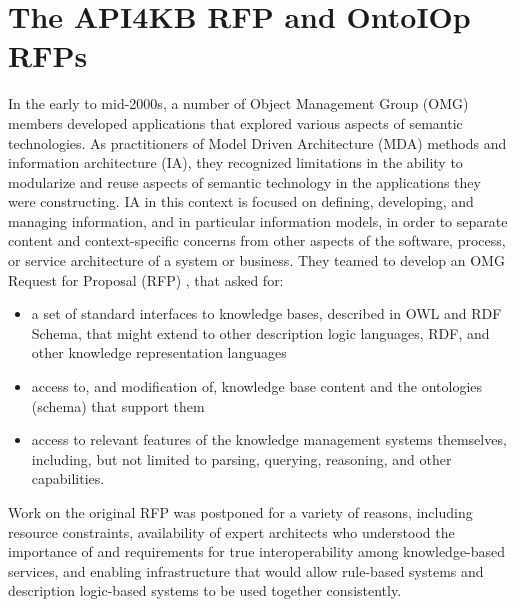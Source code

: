 \documentclass[runningheads]{llncs}
\begin{document}


\section{The API4KB RFP and OntoIOp RFPs}
\label{sec:bg}

In the early to mid-2000s, a number of Object Management Group (OMG) members developed applications that explored various aspects of semantic technologies.  As practitioners of Model Driven Architecture (MDA) methods \cite{MDA} and information architecture (IA), they recognized limitations in the ability to modularize and reuse aspects of semantic technology in the applications they were constructing.  IA in this context is focused on defining, developing, and managing information,
and in particular information models, in order to separate content and context-specific
concerns from other aspects of the software, process, or service architecture of a system or business.  They teamed to develop an OMG Request for Proposal (RFP) \cite{API4KB}, that asked for: 
\begin{itemize}
\item  a set of standard interfaces to knowledge bases, described in OWL and RDF Schema, that might extend to other description logic languages, RDF, and other
knowledge representation languages 
\item access to, and modification of, knowledge base content and the ontologies (schema) that support them
\item access to relevant features of the knowledge management systems themselves, including, but not limited to parsing, querying, reasoning, and other capabilities.
\end{itemize}

Work on the original RFP was postponed for a variety of reasons, including resource constraints, availability of expert architects who understood the importance of and requirements for true interoperability among knowledge-based services, and enabling infrastructure that would allow rule-based systems and description logic-based systems to be used together consistently.
\end{document}
